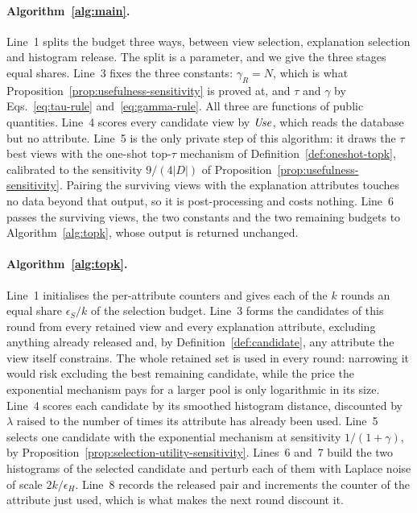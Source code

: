 \paragraph{Algorithm~\ref{alg:main}.}
Line~1 splits the budget three ways, between view selection, explanation selection and histogram release.
The split is a parameter, and we give the three stages equal shares.
Line~3 fixes the three constants: $\gamma_R=N$, which is what Proposition~\ref{prop:usefulness-sensitivity} is proved at, and $\tau$ and $\gamma$ by Eqs.~\eqref{eq:tau-rule} and~\eqref{eq:gamma-rule}. All three are functions of public quantities.
Line~4 scores every candidate view by $\mathit{Use}$, which reads the database but no attribute.
Line~5 is the only private step of this algorithm: it draws the $\tau$ best views with the one-shot top-$\tau$ mechanism of Definition~\ref{def:oneshot-topk}, calibrated to the sensitivity $9/(4|D|)$ of Proposition~\ref{prop:usefulness-sensitivity}.
Pairing the surviving views with the explanation attributes touches no data beyond that output, so it is post-processing and costs nothing.
Line~6 passes the surviving views, the two constants and the two remaining budgets to Algorithm~\ref{alg:topk}, whose output is returned unchanged.

\paragraph{Algorithm~\ref{alg:topk}.}
Line~1 initialises the per-attribute counters and gives each of the $k$ rounds an equal share $\epsilon_S/k$ of the selection budget.
Line~3 forms the candidates of this round from every retained view and every explanation attribute, excluding anything already released and, by Definition~\ref{def:candidate}, any attribute the view itself constrains.
The whole retained set is used in every round: narrowing it would risk excluding the best remaining candidate, while the price the exponential mechanism pays for a larger pool is only logarithmic in its size.
Line~4 scores each candidate by its smoothed histogram distance, discounted by $\lambda$ raised to the number of times its attribute has already been used.
Line~5 selects one candidate with the exponential mechanism at sensitivity $1/(1+\gamma)$, by Proposition~\ref{prop:selection-utility-sensitivity}.
Lines~6 and~7 build the two histograms of the selected candidate and perturb each of them with Laplace noise of scale $2k/\epsilon_H$.
Line~8 records the released pair and increments the counter of the attribute just used, which is what makes the next round discount it.

